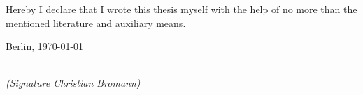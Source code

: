 \newpage

\thispagestyle{empty}

\begin{large}

\vspace*{6cm}

\noindent
Hereby I declare that I wrote this thesis myself with the help of no more than the mentioned literature and auxiliary means.
\vspace{2cm}

\noindent
Berlin, \today

\vspace{3cm}

\hspace*{7cm}%
\dotfill\\
\hspace*{8.5cm}%
\textit{(Signature Christian Bromann)}

\end{large}
